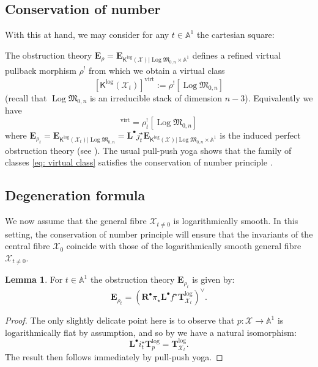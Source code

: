 \documentclass[11pt]{amsart}
\theoremstyle{definition}
\theoremstyle{definition}
\newtheorem{lemma}[theorem]{Lemma}
\newcommand{\EE}{\mathbf{E}}
\newcommand{\st}{\star}
\newcommand{\op}[1]{\operatorname{#1}}
\newcommand{\TTlog}{\mathbf{T}^{\op{log}}}
\newcommand{\TT}{\mathbf{T}}
\newcommand{\Aaff}{\mathbb{A}}
\newcommand{\virt}{\op{virt}}
\newcommand{\Xcal}{\mathcal{X}}
\newcommand{\Mfrak}{\mathfrak{M}}
\newcommand{\Rder}{\mathbf{R}^\bullet}
\newcommand{\Lder}{\mathbf{L}^\bullet}
\newcommand{\Kup}{\mathsf{K}}
\newcommand{\Log}{\operatorname{Log}}
\begin{document}
\subsection{Conservation of number} With this at hand, we may consider for any $t \in \Aaff^{\! 1}$ the cartesian square:
\begin{center}
\end{center}
The obstruction theory $\EE_\rho=\EE_{\Kup^{\log}(\Xcal)|\Log\Mfrak_{0,n}\times\Aaff^{\! 1}}$ defines \cite{ManolachePull} a refined virtual pullback morphism $\rho^!$ from which we obtain a virtual class
\begin{equation}\label{eq: virtual class} [\Kup^{\log}(\Xcal_t)]^{\virt} := \rho^! [ \Log\Mfrak_{0,n}] \end{equation}
(recall that $\Log\Mfrak_{0,n}$ is an irreducible stack of dimension $n-3$). Equivalently we have 
\begin{equation*}  [\Kup^{\log}(\Xcal_t)]^{\virt} = \rho_t^! [ \Log\Mfrak_{0,n}] \end{equation*}
where $\EE_{\rho_t}=\EE_{\Kup^{\log}(\Xcal_t)|\Log\Mfrak_{0,n}} = \Lder j_t^\st\EE_{\Kup^{\log}(\Xcal)|\Log\Mfrak_{0,n}\times\Aaff^{\! 1}}$ is the induced perfect obstruction theory (see \cite[Proposition 7.2]{BehrendFantechi}). The usual pull-push yoga shows that the family of classes \eqref{eq: virtual class} satisfies the conservation of number principle \cite[Proposition 3.9]{ManolachePush}.

\subsection{Degeneration formula} We now assume that the general fibre $\Xcal_{t \neq 0}$ is logarithmically smooth. In this setting, the conservation of number principle will ensure that the invariants of the central fibre $\Xcal_0$ coincide with those of the logarithmically smooth general fibre $\Xcal_{t \neq 0}$.

\begin{lemma} \label{lem: obstruction theory on fibre} For $t \in \Aaff^{\! 1}$ the obstruction theory $\EE_{\rho_t}$ is given by:
\begin{equation*} \EE_{\rho_t} = (\Rder \pi_\star \Lder f^\star \TT^{\log}_{\Xcal_t})^\vee. \end{equation*}\end{lemma}
\begin{proof} The only slightly delicate point here is to observe that $p\colon \Xcal \to \Aaff^{\! 1}$ is logarithmically flat by assumption, and so by \cite[(1.1 (iv))]{OlssonCotangent} we have a natural isomorphism:
\begin{equation*} \Lder i_t^\st \TTlog_p = \TTlog_{\Xcal_t}. \end{equation*}
The result then follows immediately by pull-push yoga. \end{proof}
\end{document}
